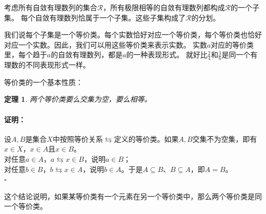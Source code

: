 \documentclass[12pt,UTF8]{ctexbook}
\newtheorem{tm}{定理}[section]
\renewenvironment{proof}{\paragraph{\textbf{证明：}}}{\hfill$\square$}
\begin{document}
\begin{appendix}
考虑所有自敛有理数列的集合$\mathcal{R}$，所有极限相等的自敛有理数列都构成$\mathcal{R}$的一个子集。
每个自敛有理数列恰属于一个子集。这些子集构成了$\mathcal{R}$的分划。

我们说每个子集是一个等价类。每个实数恰好对应一个等价类，每个等价类也恰好对应一个实数。因此，我们可以用这些等价类来表示实数。
实数$a$对应的等价类里，每个趋于$a$的自敛有理数列，都是$a$的一种表现形式。
就好比$\frac{2}{4}$和$\frac{3}{6}$是同一个有理数的不同表现形式一样。

等价类的一个基本性质：
\begin{tm}\label{lm:a-1-10}
    两个等价类要么交集为空，要么相等。    
\end{tm}
\begin{proof}
    设$A,B$是集合$X$中按照等价关系$\leftrightarrows$定义的等价类。如果$A,B$交集不为空集，即有$x\in X$，$x\in A$且$x\in B$。\\
    对任意$a\in A$，$a\leftrightarrows x\in B$，说明$a\in B$；\\
    对任意$b\in B$，$b\leftrightarrows x\in A$，说明$b\in A$。于是$A\subseteq B$、$B\subseteq A$，即$A = B$。\\
\end{proof}

这个结论说明，如果某等价类有一个元素在另一个等价类中，那么两个等价类是同一个等价类。


\end{appendix}
\end{document}
